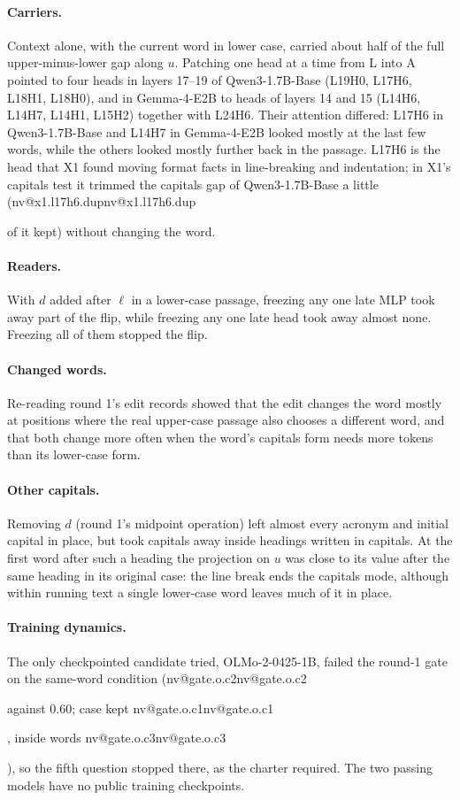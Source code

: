 \documentclass[11pt]{article}
\makeatletter
\newcommand{\nv}[1]{\ifcsname nv@#1\endcsname\csname nv@#1\endcsname\else\PackageError{numbers}{Unknown number key #1}{}\fi}
\newcommand{\gm}{Gemma-4-E2B}
\newcommand{\qw}{Qwen3-1.7B-Base}
\newcommand{\hd}[2]{L#1H#2}
\makeatother
\begin{document}
\paragraph{Carriers.} Context alone, with the current word in lower case, carried about half of the full upper-minus-lower gap along $u$. Patching one head at a time from L into A pointed to four heads in layers 17--19 of \qw{} (\hd{19}{0}, \hd{17}{6}, \hd{18}{1}, \hd{18}{0}), and in \gm{} to heads of layers 14 and 15 (\hd{14}{6}, \hd{14}{7}, \hd{14}{1}, \hd{15}{2}) together with \hd{24}{6}. Their attention differed: \hd{17}{6} in \qw{} and \hd{14}{7} in \gm{} looked mostly at the last few words, while the others looked mostly further back in the passage. \hd{17}{6} is the head that X1 found moving format facts in line-breaking and indentation; in X1's capitals test it trimmed the capitals gap of \qw{} a little (\nv{x1.l17h6.dup} of it kept) without changing the word.

\paragraph{Readers.} With $d$ added after $\ell$ in a lower-case passage, freezing any one late MLP took away part of the flip, while freezing any one late head took away almost none. Freezing all of them stopped the flip.

\paragraph{Changed words.} Re-reading round 1's edit records showed that the edit changes the word mostly at positions where the real upper-case passage also chooses a different word, and that both change more often when the word's capitals form needs more tokens than its lower-case form.

\paragraph{Other capitals.} Removing $d$ (round 1's midpoint operation) left almost every acronym and initial capital in place, but took capitals away inside headings written in capitals. At the first word after such a heading the projection on $u$ was close to its value after the same heading in its original case: the line break ends the capitals mode, although within running text a single lower-case word leaves much of it in place.

\paragraph{Training dynamics.} The only checkpointed candidate tried, OLMo-2-0425-1B, failed the round-1 gate on the same-word condition (\nv{gate.o.c2} against 0.60; case kept \nv{gate.o.c1}, inside words \nv{gate.o.c3}), so the fifth question stopped there, as the charter required. The two passing models have no public training checkpoints.
\end{document}
